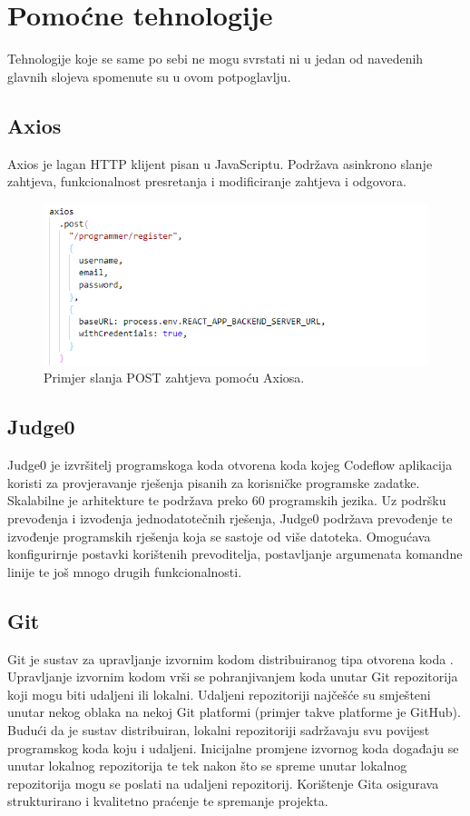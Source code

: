 \documentclass[times, utf8, zavrsni]{fer}
\begin{document}
			\section{Pomoćne tehnologije}
			Tehnologije koje se same po sebi ne mogu svrstati ni u jedan od navedenih glavnih slojeva spomenute su u ovom potpoglavlju.
			\subsection{Axios}
			Axios je lagan HTTP  klijent pisan u JavaScriptu. Podržava asinkrono slanje zahtjeva, funkcionalnost presretanja i modificiranje zahtjeva i odgovora. 
			\begin{figure}[H]
				\centering
				\includegraphics[scale=0.65]{pictures/prikazi/Axios.png}
				\caption{Primjer slanja POST zahtjeva pomoću Axiosa.}
				\label{fig:axios}
			\end{figure}
			\subsection{Judge0}
			Judge0 je izvršitelj programskoga koda otvorena koda kojeg Codeflow aplikacija koristi za provjeravanje rješenja pisanih za korisničke programske zadatke. Skalabilne je arhitekture te podržava preko 60 programskih jezika. Uz podršku prevođenja i izvođenja jednodatotečnih rješenja, Judge0 podržava prevođenje te izvođenje programskih rješenja koja se sastoje od više datoteka. Omogućava konfigurirnje postavki korištenih prevoditelja, postavljanje argumenata komandne linije te još mnogo drugih funkcionalnosti.
			\subsection{Git}
			Git je sustav za upravljanje izvornim kodom distribuiranog tipa otvorena koda . Upravljanje izvornim kodom vrši se pohranjivanjem koda unutar Git repozitorija koji mogu biti udaljeni ili lokalni. Udaljeni repozitoriji  najčešće su smješteni unutar nekog oblaka  na nekoj Git platformi (primjer takve platforme je GitHub). Budući da je sustav distribuiran, lokalni repozitoriji sadržavaju svu povijest programskog koda koju i udaljeni. Inicijalne promjene izvornog koda događaju se unutar lokalnog repozitorija te tek nakon što se spreme unutar lokalnog repozitorija mogu se poslati na udaljeni repozitorij. Korištenje Gita osigurava strukturirano i kvalitetno praćenje te spremanje projekta.
	
\end{document}
